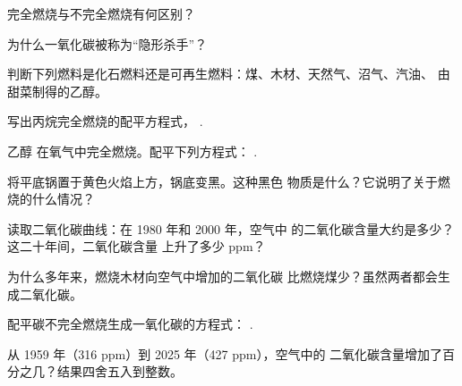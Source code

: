 \begin{exercise}[$\star$]\label{exo:g8:combustion-and-fuels:2}
完全燃烧与不完全燃烧有何区别？
\end{exercise}

\begin{exercise}[$\star$]\label{exo:g8:combustion-and-fuels:3}
为什么一氧化碳被称为“隐形杀手”？
\end{exercise}

\begin{exercise}[$\star$]\label{exo:g8:combustion-and-fuels:4}
判断下列燃料是化石燃料还是可再生燃料：煤、木材、天然气、沼气、汽油、
由甜菜制得的乙醇。
\end{exercise}

\begin{exercise}[$\star\star$]\label{exo:g8:combustion-and-fuels:5}
写出丙烷完全燃烧的配平方程式，
.
\end{exercise}

\begin{exercise}[$\star\star$]\label{exo:g8:combustion-and-fuels:6}
乙醇  在氧气中完全燃烧。配平下列方程式：
. %
\end{exercise}

\begin{exercise}[$\star\star$]\label{exo:g8:combustion-and-fuels:7}
将平底锅置于黄色火焰上方，锅底变黑。这种黑色
物质是什么？它说明了关于燃烧的什么情况？
\end{exercise}

\begin{exercise}[$\star\star$]\label{exo:g8:combustion-and-fuels:8}
读取二氧化碳曲线：在 1980 年和 2000 年，空气中
的二氧化碳含量大约是多少？这二十年间，二氧化碳含量
上升了多少 ppm？
\end{exercise}

\begin{exercise}[$\star\star$]\label{exo:g8:combustion-and-fuels:9}
为什么多年来，燃烧木材向空气中增加的二氧化碳
比燃烧煤少？虽然两者都会生成二氧化碳。
\end{exercise}

\begin{exercise}[$\star\star$]\label{exo:g8:combustion-and-fuels:10}
配平碳不完全燃烧生成一氧化碳的方程式：
. %
\end{exercise}

\begin{exercise}[$\star\star\star$]\label{exo:g8:combustion-and-fuels:11}
从 1959 年（316 ppm）到 2025 年（427 ppm），空气中的
二氧化碳含量增加了百分之几？结果四舍五入到整数。
\end{exercise}

